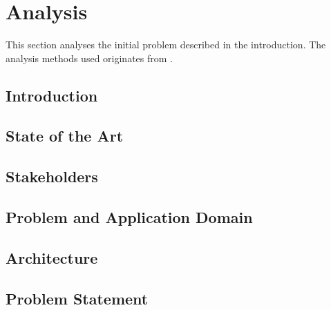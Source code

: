 \chapter{Analysis}

This section analyses the initial problem described in the introduction. The analysis methods used originates from \cite{mathiassen2001objektorienteret}. 

\section{Introduction}

\section{State of the Art}

\section{Stakeholders}

\section{Problem and Application Domain}

\section{Architecture}

\section{Problem Statement}
